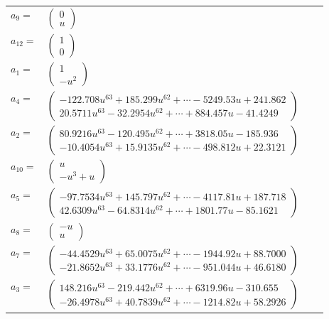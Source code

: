 \documentclass[1p]{elsarticle_modified}
\theoremstyle{definition}
\begin{document}
\begin{tabular}{m{7pt} m{180pt} m{7pt} m{180pt} }
\flushright $a_{9}=$&$\begin{pmatrix}0\\u\end{pmatrix}$ \\
\flushright $a_{12}=$&$\begin{pmatrix}1\\0\end{pmatrix}$ \\
\flushright $a_{1}=$&$\begin{pmatrix}1\\- u^2\end{pmatrix}$ \\
\flushright $a_{4}=$&$\begin{pmatrix}-122.708 u^{63}+185.299 u^{62}+\cdots-5249.53 u+241.862\\20.5711 u^{63}-32.2954 u^{62}+\cdots+884.457 u-41.4249\end{pmatrix}$ \\
\flushright $a_{2}=$&$\begin{pmatrix}80.9216 u^{63}-120.495 u^{62}+\cdots+3818.05 u-185.936\\-10.4054 u^{63}+15.9135 u^{62}+\cdots-498.812 u+22.3121\end{pmatrix}$ \\
\flushright $a_{10}=$&$\begin{pmatrix}u\\- u^3+u\end{pmatrix}$ \\
\flushright $a_{5}=$&$\begin{pmatrix}-97.7534 u^{63}+145.797 u^{62}+\cdots-4117.81 u+187.718\\42.6309 u^{63}-64.8314 u^{62}+\cdots+1801.77 u-85.1621\end{pmatrix}$ \\
\flushright $a_{8}=$&$\begin{pmatrix}- u\\u\end{pmatrix}$ \\
\flushright $a_{7}=$&$\begin{pmatrix}-44.4529 u^{63}+65.0075 u^{62}+\cdots-1944.92 u+88.7000\\-21.8652 u^{63}+33.1776 u^{62}+\cdots-951.044 u+46.6180\end{pmatrix}$ \\
\flushright $a_{3}=$&$\begin{pmatrix}148.216 u^{63}-219.442 u^{62}+\cdots+6319.96 u-310.655\\-26.4978 u^{63}+40.7839 u^{62}+\cdots-1214.82 u+58.2926\end{pmatrix}$ \\

\end{tabular}
\end{document}
